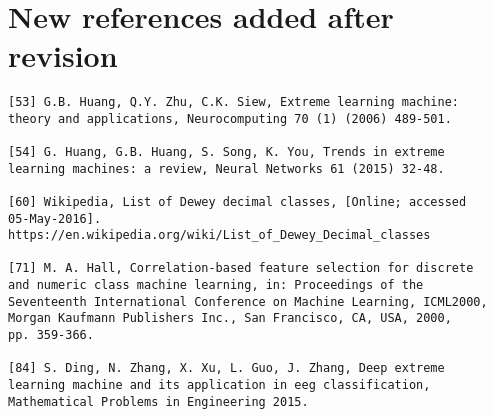 \documentclass[preprint]{elsarticle}
\begin{document}
~\\

\section{New references added after revision}

\begin{verbatim}
[53] G.B. Huang, Q.Y. Zhu, C.K. Siew, Extreme learning machine: 
theory and applications, Neurocomputing 70 (1) (2006) 489-501.

[54] G. Huang, G.B. Huang, S. Song, K. You, Trends in extreme 
learning machines: a review, Neural Networks 61 (2015) 32-48.

[60] Wikipedia, List of Dewey decimal classes, [Online; accessed 
05-May-2016]. https://en.wikipedia.org/wiki/List_of_Dewey_Decimal_classes

[71] M. A. Hall, Correlation-based feature selection for discrete 
and numeric class machine learning, in: Proceedings of the 
Seventeenth International Conference on Machine Learning, ICML2000, 
Morgan Kaufmann Publishers Inc., San Francisco, CA, USA, 2000, 
pp. 359-366.

[84] S. Ding, N. Zhang, X. Xu, L. Guo, J. Zhang, Deep extreme 
learning machine and its application in eeg classification, 
Mathematical Problems in Engineering 2015.

\end{verbatim}
\end{document}
